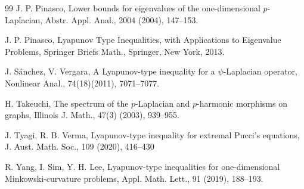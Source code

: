 \documentclass[twoside,12pt,letter]{article}
\theoremstyle{plain}
\theoremstyle{definition}
\theoremstyle{remark}
\numberwithin{equation}{section}
\begin{document}
\begin{thebibliography}{99}
J. P. Pinasco, 
Lower bounds for eigenvalues of the one-dimensional \(p\)-Laplacian, Abstr. Appl. Anal., 
2004 (2004),  147--153.

J. P. Pinasco, 
Lyapunov Type Inequalities, with Applications to Eigenvalue Problems, 
Springer Briefs Math., Springer, New York, 2013.






J. S\'anchez, V. Vergara, 
A Lyapunov-type inequality for a \(\psi\)-Laplacian operator, 
Nonlinear Anal., 
74(18)(2011), 7071--7077.


H. Takeuchi,
The spectrum of the \(p\)-Laplacian and \(p\)-harmonic morphisms on graphs,
Illinois J. Math.,
47(3) (2003), 939--955.


J. Tyagi, R. B. Verma, 
Lyapunov-type inequality for extremal Pucci's equations,
J. Aust. Math. Soc., 
109 (2020), 416--430



R. Yang, I. Sim, Y. H. Lee, 
Lyapunov-type inequalities for one-dimensional Minkowski-curvature problems,
Appl. Math. Lett.,
91 (2019), 188--193.

	
\end{thebibliography}
\end{document}
